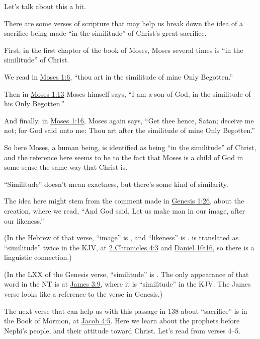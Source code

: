 \begin{compactitem}
\begin{compactitem}
					\item Let's talk about this a bit.
					\item {}
					\item There are some verses of scripture that may help us break down the idea of a sacrifice being made ``in the similitude'' of Christ's great sacrifice.
						\begin{compactitem}
							\item First, in the first chapter of the book of Moses, Moses several times is ``in the similitude'' of Christ.
							\item We read in \hyperref[MOSES-1-6]{Moses 1:6}, ``thou art in the similitude of mine Only Begotten.''
							\item Then in \hyperref[MOSES-1-13]{Moses 1:13} Moses himself says, ``I am a son of God, in the similitude of his Only Begotten.''
							\item And finally, in \hyperref[MOSES-1-16]{Moses 1:16}, Moses again says, ``Get thee hence, Satan; deceive me not; for God said unto me: Thou art after the similitude of mine Only Begotten.''
							\item So here Moses, a human being, is identified as being ``in the similitude'' of Christ, and the reference here seems to be to the fact that Moses is a child of God in some sense the same way that Christ is.
							\item ``Similitude'' doesn't mean exactness, but there's some kind of similarity.
							\item The idea here might stem from the comment made in \hyperref[GENESIS-1-26]{Genesis 1:26}, about the creation, where we read, ``And God said, Let us make man in our image, after our likeness.''
							\item (In the Hebrew of that verse, ``image'' is , and ``likeness'' is \he{d*:mUt}.  is translated as ``similitude'' twice in the KJV, at \hyperref[2CHRONICLES-4-3]{2 Chronicles 4:3} and \hyperref[DANIEL-10-16]{Daniel 10:16}, so there is a linguistic connection.)
							\item (In the LXX of the Genesis verse, ``similitude'' is . The only appearance of that word in the NT is at \hyperref[JAMES-3-9]{James 3:9}, where it is ``similitude'' in the KJV. The James verse looks like a reference to the verse in Genesis.)
							\item The next verse that can help us with this passage in 138 about ``sacrifice'' is in the Book of Mormon, at \hyperref[JACOB-4-5]{Jacob 4:5}. Here we learn about the prophets before Nephi's people, and their attitude toward Christ. Let's read from verses 4--5.	

\end{compactitem}
\end{compactitem}
\end{compactitem}
